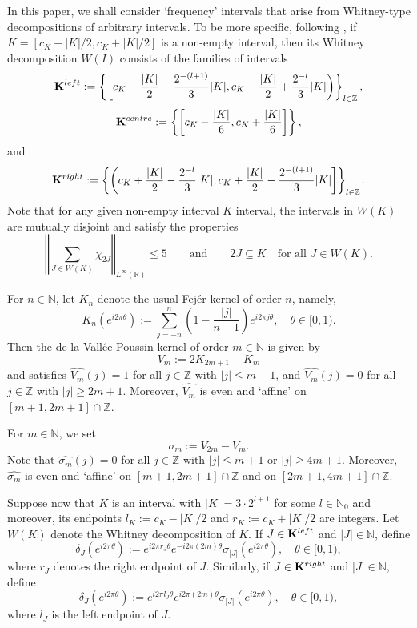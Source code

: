 \documentclass[a4paper, leqno, 10pt]{amsart}
\numberwithin{equation}{section}
\newcommand{\R}{\mathbb{R}}
\newcommand{\norm}[1]{\left\Vert#1\right\Vert}
\newcommand{\Z}{\mathbb{Z}}
\newcommand{\N}{\mathbb{N}}
\begin{document}
In this paper, we shall consider `frequency' intervals that arise from Whitney-type decompositions of arbitrary intervals. To be more specific, following \cite{RdF}, if $K = [ c_K - |K|/2, c_K + |K|/2]$ is a non-empty interval, then its Whitney decomposition $W(I)$ consists of the families of intervals
\[ 
\mathbf{K}^{\rm left} := 
\left\{ \left[ c_K -\frac{|K|}{2} + \frac{ 2^{-(l+1)}}{3} |K| , c_K -\frac{ |K|}{2} + \frac{ 2^{-l}}{3} |K| \right) \right\}_{l \in \Z},
\]
\[
\mathbf{K}^{\rm centre} := \left\{ \left[ c_K -\frac{ |K|}{6}, c_K + \frac{|K|}{6} \right] \right\} ,  
\]
and
\[
\mathbf{K}^{\rm right } := \left\{ \left( c_K + \frac{|K|}{2} - \frac{2^{-l}}{3} |K| , c_K + \frac{|K|}{2} - \frac{ 2^{-(l+1)}}{3} |K| \right] \right\}_{l \in \Z}. 
\]
Note that for any given non-empty interval $K$ interval, the intervals in $W(K)$ are mutually disjoint and satisfy the properties
\begin{equation*} 
 \norm{ \sum_{J \in W(K)} \chi_{2J} }_{L^{\infty} (\R)} \leq 5 \qquad \text{and} \qquad 2 J \subseteq K \quad \text{for all } J \in W (K).
\end{equation*}


For $n \in \N$, let $K_n$ denote the usual Fej\'er kernel of order $n$, namely,
\[ 
K_n (e^{i 2 \pi \theta}):= \sum_{j=-n}^n \left( 1- \frac{|j|}{n+1} \right)  e^{i 2 \pi j \theta}, \quad \theta \in [0,1). 
\]
Then the de la Vall\'ee Poussin kernel of order $m \in \N$ is given by
\[ 
V_m := 2 K_{2m+1} - K_m 
\]
and satisfies $\widehat{V_m} (j) = 1$ for all $j \in \Z$ with $|j| \leq m+1$, and $\widehat{V_m} (j) = 0$ for all $j \in \Z$ with $|j| \geq  2m + 1$. Moreover, $\widehat{V_m}$ is even and `affine' on $ [m+1, 2m+1] \cap \Z $. 

For $m \in \N$, we set
\[ 
\sigma_m := V_{2m} - V_m .
\]
Note that $\widehat{\sigma_m} (j)=0$ for all $j \in \Z$ with $|j| \leq m+1$ or $|j| \geq 4m+1$. Moreover, $\widehat{\sigma_m}$ is even and `affine' on $ [m+1, 2m+1] \cap \Z $ and on $ [2m+1, 4m+1] \cap \Z $.

Suppose now that $K$ is an interval with $|K| = 3 \cdot 2^{l+1}$ for some $l \in \N_0$ and moreover, its endpoints $l_K := c_K - |K|/2 $ and $r_K := c_K + |K|/2 $ are integers. Let $W(K)$ denote the Whitney decomposition of $K$. If $J \in \mathbf{K}^{\rm left} $ and $|J| \in \N$, define 
\[ 
\delta_J (e^{i 2 \pi \theta}) :=  e^{i 2 \pi r_J \theta} e^{-i 2 \pi (2m)  \theta} \sigma_{|J|} (e^{i 2 \pi \theta}) , \quad \theta \in [0,1),
\]
where $r_J$ denotes the right endpoint of $J$. Similarly, if $J \in \mathbf{K}^{\rm right} $ and $|J| \in \N$, define 
\[ 
\delta_J (e^{i 2 \pi \theta}) :=  e^{i 2 \pi l_J \theta} e^{i 2 \pi (2m)  \theta} \sigma_{|J|} (e^{i 2 \pi \theta}) , \quad \theta \in [0,1),
\]
where $l_J$ is the left endpoint of $J$. 
\end{document}
